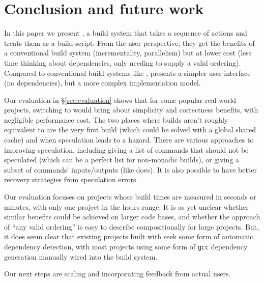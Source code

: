 \section{Conclusion and future work}
\label{sec:conclusion}

In this paper we present \Rattle, a build system that  takes a sequence of actions and treats them as a build script. From the user perspective, they get the benefits of a conventional build system (incrementality, parallelism) but at lower cost (less time thinking about dependencies, only needing to supply a valid ordering). Compared to conventional build systems like \Make,  \Rattle presents a simpler user interface (no dependencies), but a more complex implementation model.

Our evaluation in \S\ref{sec:evaluation} shows that for some popular real-world projects, switching to \Rattle would bring about simplicity and correctness benefits, with negligible performance cost. The two places where builds aren't roughly equivalent to \Make are the very first build (which could be solved with a global shared cache) and when speculation leads to a hazard. There are various approaches to improving speculation, including giving \Rattle a list of commands that should not be speculated (which can be a perfect list for non-monadic builds), or giving \Rattle a subset of commands' inputs/outputs (like \Fac does). It is also possible to have better recovery strategies from speculation errors.

Our evaluation focuses on projects whose build times are measured in seconds or minutes, with only one project in the hours range. It is as yet unclear whether similar benefits could be achieved on larger code bases, and whether the \Rattle approach of ``any valid ordering'' is easy to describe compositionally for large projects.  But, it does seem clear that existing projects built with \Make seek some form of automatic dependency detection, with most projects using some form of \texttt{gcc} dependency generation manually wired into the build system.

Our next steps are scaling \Rattle and incorporating feedback from actual users.


